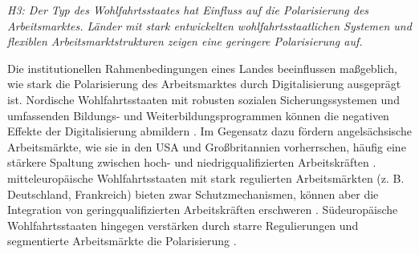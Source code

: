\textit{H3: Der Typ des Wohlfahrtsstaates hat Einfluss auf die Polarisierung des 
Arbeitsmarktes. Länder mit stark entwickelten wohlfahrtsstaatlichen Systemen und flexiblen 
Arbeitsmarktstrukturen zeigen eine geringere Polarisierung auf.}

Die institutionellen Rahmenbedingungen eines Landes beeinflussen maßgeblich, wie stark die 
Polarisierung des Arbeitsmarktes durch Digitalisierung ausgeprägt ist. Nordische 
Wohlfahrtsstaaten mit robusten sozialen Sicherungssystemen und umfassenden Bildungs- und 
Weiterbildungsprogrammen können die negativen Effekte der Digitalisierung abmildern 
\parencite[vgl.][S. 27–28]{espingandersen1990thethree}. Im Gegensatz dazu fördern 
angelsächsische Arbeitsmärkte, wie sie in den USA und Großbritannien vorherrschen, häufig 
eine stärkere Spaltung zwischen hoch- und niedrigqualifizierten Arbeitskräften 
\parencite[vgl.][12–13]{goodin1999thereal}. mitteleuropäische Wohlfahrtsstaaten mit stark 
regulierten Arbeitsmärkten (z. B. Deutschland, Frankreich) bieten zwar Schutzmechanismen, 
können aber die Integration von geringqualifizierten Arbeitskräften erschweren 
\parencite[vgl.][S. 78]{hall2001varieties}. Südeuropäische Wohlfahrtsstaaten hingegen 
verstärken durch starre Regulierungen und segmentierte Arbeitsmärkte die Polarisierung 
\parencite[vgl.][S. 17–37]{ferrera1996thesouthern}.
